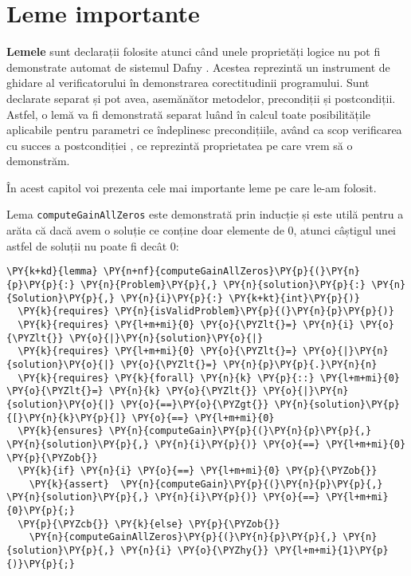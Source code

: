 \chapter{Leme importante}
\begin{sloppypar}

\textbf{Lemele} sunt declarații folosite atunci când unele proprietăți logice nu pot fi demonstrate automat de sistemul Dafny \cite{leino2021dafny}. Acestea reprezintă un instrument de ghidare al verificatorului în demonstrarea corectitudinii programului. Sunt declarate separat și pot avea, asemănător metodelor, precondiții și postcondiții. Astfel, o lemă va fi demonstrată separat luând în calcul toate posibilitățile aplicabile pentru parametri ce îndeplinesc precondițiile, având ca scop verificarea cu succes a postcondiției \cite{leino2021dafny}, ce reprezintă proprietatea pe care vrem să o demonstrăm. \par
În acest capitol voi prezenta cele mai importante leme pe care le-am folosit.
\par
Lema \texttt{computeGainAllZeros} este demonstrată prin inducție și este utilă pentru a arăta că dacă avem o soluție ce conține doar elemente de 0, atunci câștigul unei astfel de soluții nu poate fi decât 0: 
\begin{Verbatim}[commandchars=\\\{\}]
\PY{k+kd}{lemma} \PY{n+nf}{computeGainAllZeros}\PY{p}{(}\PY{n}{p}\PY{p}{:} \PY{n}{Problem}\PY{p}{,} \PY{n}{solution}\PY{p}{:} \PY{n}{Solution}\PY{p}{,} \PY{n}{i}\PY{p}{:} \PY{k+kt}{int}\PY{p}{)}
  \PY{k}{requires} \PY{n}{isValidProblem}\PY{p}{(}\PY{n}{p}\PY{p}{)}
  \PY{k}{requires} \PY{l+m+mi}{0} \PY{o}{\PYZlt{}=} \PY{n}{i} \PY{o}{\PYZlt{}} \PY{o}{|}\PY{n}{solution}\PY{o}{|}
  \PY{k}{requires} \PY{l+m+mi}{0} \PY{o}{\PYZlt{}=} \PY{o}{|}\PY{n}{solution}\PY{o}{|} \PY{o}{\PYZlt{}=} \PY{n}{p}\PY{p}{.}\PY{n}{n} 
  \PY{k}{requires} \PY{k}{forall} \PY{n}{k} \PY{p}{::} \PY{l+m+mi}{0} \PY{o}{\PYZlt{}=} \PY{n}{k} \PY{o}{\PYZlt{}} \PY{o}{|}\PY{n}{solution}\PY{o}{|} \PY{o}{==}\PY{o}{\PYZgt{}} \PY{n}{solution}\PY{p}{[}\PY{n}{k}\PY{p}{]} \PY{o}{==} \PY{l+m+mi}{0}
  \PY{k}{ensures} \PY{n}{computeGain}\PY{p}{(}\PY{n}{p}\PY{p}{,} \PY{n}{solution}\PY{p}{,} \PY{n}{i}\PY{p}{)} \PY{o}{==} \PY{l+m+mi}{0}
\PY{p}{\PYZob{}}
  \PY{k}{if} \PY{n}{i} \PY{o}{==} \PY{l+m+mi}{0} \PY{p}{\PYZob{}}
    \PY{k}{assert}  \PY{n}{computeGain}\PY{p}{(}\PY{n}{p}\PY{p}{,} \PY{n}{solution}\PY{p}{,} \PY{n}{i}\PY{p}{)} \PY{o}{==} \PY{l+m+mi}{0}\PY{p}{;}
  \PY{p}{\PYZcb{}} \PY{k}{else} \PY{p}{\PYZob{}}
    \PY{n}{computeGainAllZeros}\PY{p}{(}\PY{n}{p}\PY{p}{,} \PY{n}{solution}\PY{p}{,} \PY{n}{i} \PY{o}{\PYZhy{}} \PY{l+m+mi}{1}\PY{p}{)}\PY{p}{;}

\end{Verbatim}
\end{sloppypar}
